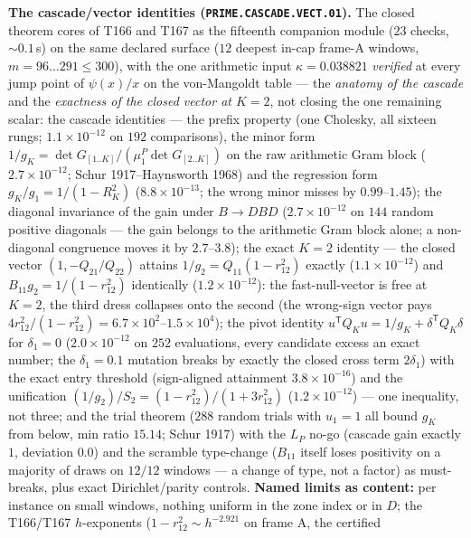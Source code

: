 \par\smallskip\noindent\textbf{The cascade/vector identities
(\texttt{PRIME.CASCADE.VECT.01}).}
The closed theorem cores of T166 and T167 as the fifteenth companion
module ($23$ checks, ${\sim}0.1$\,s) on the same declared surface ($12$
deepest in-cap frame-A windows, $m=96\ldots291\le300$), with the one
arithmetic input $\kappa=0.038821$ \emph{verified} at every jump point
of $\psi(x)/x$ on the von-Mangoldt table --- the \emph{anatomy of the
cascade} and the \emph{exactness of the closed vector at $K=2$}, not
closing the one remaining scalar: the cascade identities --- the prefix
property (one Cholesky, all sixteen rungs; $1.1\times10^{-12}$ on $192$
comparisons), the minor form
$1/g_K=\det G_{[1..K]}/(\mu^P_1\det G_{[2..K]})$ on the raw arithmetic
Gram block ($2.7\times10^{-12}$; Schur 1917--Haynsworth 1968) and the
regression form $g_K/g_1=1/(1-R_K^2)$ ($8.8\times10^{-13}$; the wrong
minor misses by $0.99$--$1.45$); the diagonal invariance of the gain
under $B\to DBD$ ($2.7\times10^{-12}$ on $144$ random positive
diagonals --- the gain belongs to the arithmetic Gram block alone; a
non-diagonal congruence moves it by $2.7$--$3.8$); the exact $K=2$
identity --- the closed vector $(1,-Q_{21}/Q_{22})$ attains
$1/g_2=Q_{11}(1-r_{12}^2)$ exactly ($1.1\times10^{-12}$) and
$B_{11}g_2=1/(1-r_{12}^2)$ identically ($1.2\times10^{-12}$): the
fast-null-vector is free at $K=2$, the third dress collapses onto the
second (the wrong-sign vector pays
$4r_{12}^2/(1-r_{12}^2)=6.7\times10^{2}$--$1.5\times10^{4}$); the pivot
identity $u^{\mathsf T}Q_Ku=1/g_K+\delta^{\mathsf T}Q_K\delta$ for
$\delta_1=0$ ($2.0\times10^{-12}$ on $252$ evaluations, every candidate
excess an exact number; the $\delta_1=0.1$ mutation breaks by exactly
the closed cross term $2\delta_1$) with the exact entry threshold
(sign-aligned attainment $3.8\times10^{-16}$) and the unification
$(1/g_2)/S_2=(1-r_{12}^2)/(1+3r_{12}^2)$ ($1.2\times10^{-12}$) --- one
inequality, not three; and the trial theorem ($288$ random trials with
$u_1=1$ all bound $g_K$ from below, min ratio $15.14$; Schur 1917) with
the $L_P$ no-go (cascade gain exactly $1$, deviation $0.0$) and the
scramble type-change ($B_{11}$ itself loses positivity on a majority of
draws on $12/12$ windows --- a change of type, not a factor) as
must-breaks, plus exact Dirichlet/parity controls.
\textbf{Named limits as content:} per instance on small windows,
nothing uniform in the zone index or in $D$; the T166/T167
$h$-exponents ($1-r_{12}^2\sim h^{-2.921}$ on frame A, the certified
